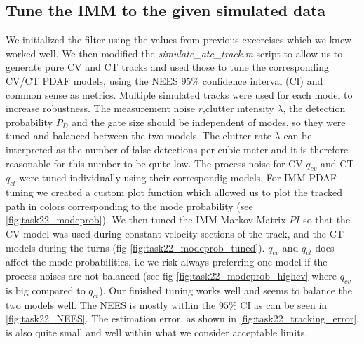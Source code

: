 \subsection{Tune the IMM to the given simulated data}

We initialized the filter using the values from previous excercises which we knew worked well. We then modified the \textit{simulate\_atc\_track.m} script to allow us to generate pure CV and CT tracks and used those to tune the corresponding CV/CT PDAF models, using the NEES $95 \%$ confidence interval (CI) and common sense as metrics. Multiple simulated tracks were used for each model to increase robustness. The measurement noise $r$,clutter intensity $\lambda$, the detection probability $P_D$ and the gate size should be independent of modes, so they were tuned and balanced between the two models. The clutter rate $\lambda$ can be interpreted as the number of false detections per cubic meter and it is therefore reasonable for this number to be quite low. The process noise for CV $q_{cv}$ and CT $q_{ct}$ were tuned individually using their correspondig models. For IMM PDAF tuning we created a custom plot function which allowed us to plot the tracked path in colors corresponding to the mode probability (see \cref{fig:task22_modeprob}). We then tuned the IMM Markov Matrix $PI$ so that the CV model was used during constant velocity sections of the track, and the CT models during the turns (fig \ref{fig:task22_modeprob_tuned}). $q_{cv}$ and $q_{ct}$ does affect the mode probabilities, i.e we risk always preferring one model if the process noises are not balanced (see fig \ref{fig:task22_modeprob_highcv} where $q_{cv}$ is big compared to $q_{ct}$). Our finished tuning works well and seems to balance the two models well. The NEES is mostly within the $95\%$ CI as can be seen in \cref{fig:task22_NEES}. The estimation error, as shown in \cref{fig:task22_tracking_error}, is also quite small and well within what we consider acceptable limits.

